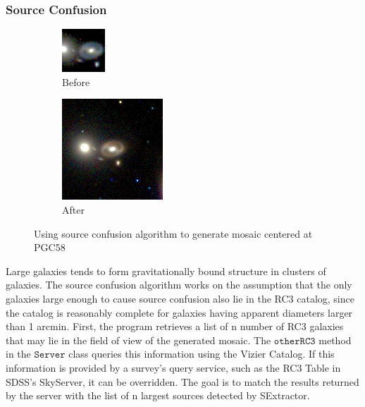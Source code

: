 \documentclass[5p]{elsarticle}
\begin{document}
	\subsubsection{Source Confusion}
\begin{figure}
\begin{subfigure}{.2\textwidth}
\centering
  \includegraphics[width=.5\linewidth ]{figures/PGC58b4SC}
  \caption{Before}
\end{subfigure}%
\begin{subfigure}{.2\textwidth}
\centering
  \includegraphics[width=.5\linewidth]{figures/PGC58afterSC}
  \caption{After} 
\end{subfigure}
\caption{Using source confusion algorithm to generate mosaic centered at PGC58}
\label{fig:SCdemo}
\end{figure}
\indent Large galaxies tends to form gravitationally bound structure in clusters of galaxies. The source confusion algorithm works on the assumption that the only galaxies large enough to cause source confusion also lie in the RC3 catalog, since the catalog is reasonably complete for galaxies having apparent diameters larger than 1 arcmin. First, the program retrieves a list of n number of RC3 galaxies that may lie in the field of view of the generated mosaic. The $\texttt{otherRC3}$ method in the $\texttt{Server}$ class queries this information using the Vizier Catalog. If this information is provided by a survey's query service, such as the RC3 Table in SDSS's SkyServer, it can be overridden. The goal is to match the results returned by the server with the list of n largest sources detected by SExtractor. 
\end{document}
